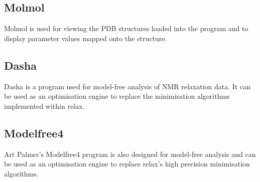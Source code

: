 \subsection{Molmol}

Molmol is used for viewing the PDB structures loaded into the program and to display parameter values mapped onto the structure.


\subsection{Dasha}

Dasha is a program used for model-free analysis of NMR relaxation data.  It can be used as an optimisation engine to replace the minimisation algorithms implemented within relax.


\subsection{Modelfree4}

Art Palmer's Modelfree4 program is also designed for model-free analysis and can be used as an optimisation engine to replace relax's high precision minimisation algorithms.
